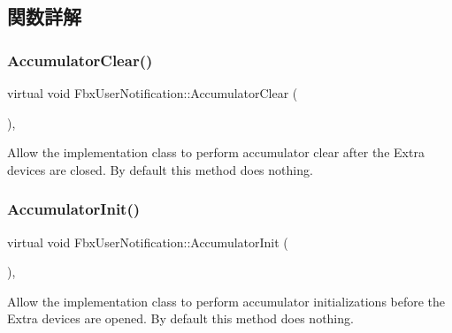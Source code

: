 \subsection{関数詳解}
\mbox{\label{class_fbx_user_notification_a3ac8af5a7f64cdd9926080b0c439e21d}} 
\subsubsection{\texorpdfstring{Accumulator\+Clear()}{AccumulatorClear()}}
{\footnotesize\ttfamily virtual void Fbx\+User\+Notification\+::\+Accumulator\+Clear (\begin{DoxyParamCaption}{ }\end{DoxyParamCaption})\hspace{0.3cm}{\ttfamily [protected]}, {\ttfamily [virtual]}}

Allow the implementation class to perform accumulator clear after the Extra devices are closed. By default this method does nothing. \mbox{\label{class_fbx_user_notification_a07fd5ef9836a3c445641dbbab9900ecd}} 
\subsubsection{\texorpdfstring{Accumulator\+Init()}{AccumulatorInit()}}
{\footnotesize\ttfamily virtual void Fbx\+User\+Notification\+::\+Accumulator\+Init (\begin{DoxyParamCaption}{ }\end{DoxyParamCaption})\hspace{0.3cm}{\ttfamily [protected]}, {\ttfamily [virtual]}}

Allow the implementation class to perform accumulator initializations before the Extra devices are opened. By default this method does nothing. \mbox{\label{class_fbx_user_notification_a612d9fbba6d767dcd4614e4f4934298a}} 

